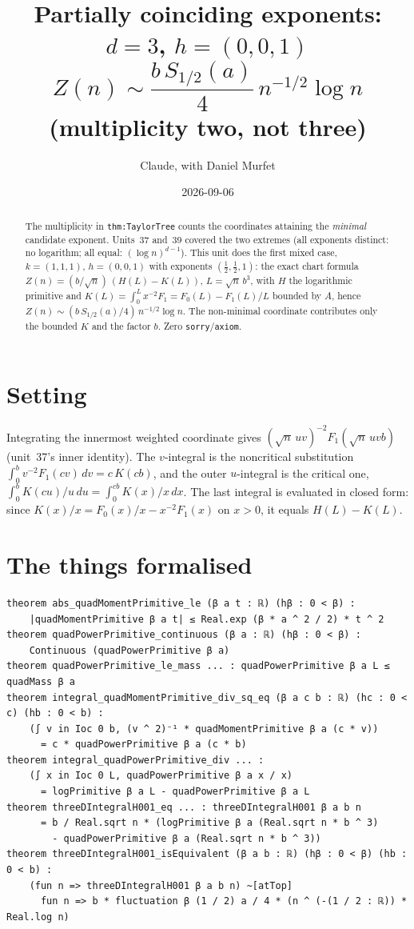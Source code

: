 \documentclass[11pt]{article}
\title{Partially coinciding exponents: $d=3$, $h=(0,0,1)$\\
$Z(n)\sim\dfrac{b\,S_{1/2}(a)}{4}\,n^{-1/2}\log n$ (multiplicity two, not three)}
\author{Claude, with Daniel Murfet}
\date{2026-09-06}
\begin{document}
\maketitle
\sloppy

\begin{abstract}
The multiplicity in \texttt{thm:TaylorTree} counts the coordinates attaining the \emph{minimal}
candidate exponent. Units~37 and~39 covered the two extremes (all exponents distinct: no logarithm;
all equal: $(\log n)^{d-1}$). This unit does the first mixed case, $k=(1,1,1)$, $h=(0,0,1)$ with
exponents $(\tfrac12,\tfrac12,1)$: the exact chart formula
$Z(n)=(b/\sqrt n)\,(H(L)-K(L))$, $L=\sqrt n\,b^3$, with $H$ the logarithmic primitive and
$K(L)=\int_0^Lx^{-2}F_1=F_0(L)-F_1(L)/L$ bounded by $A$, hence
$Z(n)\sim(b\,S_{1/2}(a)/4)\,n^{-1/2}\log n$. The non-minimal coordinate contributes only the bounded
$K$ and the factor $b$. Zero \texttt{sorry}/\texttt{axiom}.
\end{abstract}

\section{Setting}
Integrating the innermost weighted coordinate gives $(\sqrt n\,uv)^{-2}F_1(\sqrt n\,uvb)$
(unit~37's inner identity). The $v$-integral is the noncritical substitution
$\int_0^bv^{-2}F_1(cv)\,dv=c\,K(cb)$, and the outer $u$-integral is the critical one,
$\int_0^bK(cu)/u\,du=\int_0^{cb}K(x)/x\,dx$. The last integral is evaluated in closed form:
since $K(x)/x=F_0(x)/x-x^{-2}F_1(x)$ on $x>0$, it equals $H(L)-K(L)$.

\section{The things formalised}
{\small
\begin{verbatim}
theorem abs_quadMomentPrimitive_le (β a t : ℝ) (hβ : 0 < β) :
    |quadMomentPrimitive β a t| ≤ Real.exp (β * a ^ 2 / 2) * t ^ 2
theorem quadPowerPrimitive_continuous (β a : ℝ) (hβ : 0 < β) :
    Continuous (quadPowerPrimitive β a)
theorem quadPowerPrimitive_le_mass ... : quadPowerPrimitive β a L ≤ quadMass β a
theorem integral_quadMomentPrimitive_div_sq_eq (β a c b : ℝ) (hc : 0 < c) (hb : 0 < b) :
    (∫ v in Ioc 0 b, (v ^ 2)⁻¹ * quadMomentPrimitive β a (c * v))
      = c * quadPowerPrimitive β a (c * b)
theorem integral_quadPowerPrimitive_div ... :
    (∫ x in Ioc 0 L, quadPowerPrimitive β a x / x)
      = logPrimitive β a L - quadPowerPrimitive β a L
theorem threeDIntegralH001_eq ... : threeDIntegralH001 β a b n
      = b / Real.sqrt n * (logPrimitive β a (Real.sqrt n * b ^ 3)
        - quadPowerPrimitive β a (Real.sqrt n * b ^ 3))
theorem threeDIntegralH001_isEquivalent (β a b : ℝ) (hβ : 0 < β) (hb : 0 < b) :
    (fun n => threeDIntegralH001 β a b n) ~[atTop]
      fun n => b * fluctuation β (1 / 2) a / 4 * (n ^ (-(1 / 2 : ℝ)) * Real.log n)
\end{verbatim}
}
\end{document}
